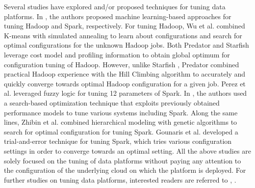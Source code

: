 \documentclass[3p]{elsarticle}
\begin{document}
Several studies have explored and/or proposed techniques for tuning data platforms. In \cite{yigitbasi2013towards, wang2016novel}, the authors proposed machine learning-based approaches for tuning Hadoop and Spark, respectively. For tuning Hadoop, Wu et al. \cite{wu2013self} combined K-means with simulated annealing to learn about configurations and search for optimal configurations for the unknown Hadoop jobs. Both Predator \cite{wang2012predator} and Starfish \cite{herodotou2011starfish} leverage cost model and profiling information to obtain global optimum for configuration tuning of Hadoop. However, unlike Starfish \cite{herodotou2011starfish}, Predator \cite{wang2012predator} combined practical Hadoop experience with the Hill Climbing algorithm to accurately and quickly converge towards optimal Hadoop configuration for a given job. Perez et al. \cite{perez2018pets} leveraged fuzzy logic for tuning 12 parameters of Spark. In \cite{zhu2017bestconfig}, the authors used a search-based optimization technique that exploits previously obtained performance models to tune various systems including Spark. Along the same lines, Zhibin et al. \cite{yu2018datasize} combined hierarchical modeling with genetic algorithms to search for optimal configuration for tuning Spark. Gounaris et al. \cite{gounaris2018methodology} developed a trial-and-error technique for tuning Spark, which tries various configuration settings in order to converge towards an optimal setting. All the above studies are solely focused on the tuning of data platforms without paying any attention to the configuration of the underlying cloud on which the platform is deployed. For further studies on tuning data platforms, interested readers are referred to \cite{herodotou2020survey}, \cite{costa2021survey}.
\end{document}
